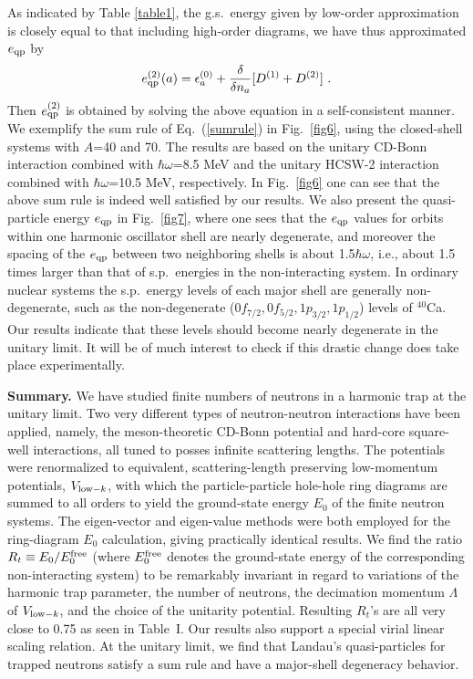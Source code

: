 \documentclass[twocolumn,preprintnumbers,superscriptaddress]{revtex4}
\begin{document}
As indicated by Table \ref{table1}, the g.s.~energy given by low-order approximation is closely equal to that including high-order diagrams,
we have thus approximated $e_{\rm qp}$ by
\begin{equation}
 e_{\rm qp}^{(2)}(a)
 = \epsilon _a^{(0)} +\frac{\delta}{\delta n_a}[D^{(1)}+D^{(2)}]~.
\end{equation}
Then $e_{\rm qp}^{(2)}$ is obtained by solving the above equation in a self-consistent manner.
We exemplify the sum rule of Eq.~(\ref{sumrule}) in Fig.~\ref{fig6}, using the closed-shell systems with $A$=40 and 70.
The results are based on the unitary CD-Bonn interaction
combined with $\hbar\omega$=8.5 MeV
and the unitary HCSW-2 interaction combined with
$\hbar\omega$=10.5 MeV, respectively.
In Fig.~\ref{fig6} one can see that the above sum rule is indeed well satisfied by our results.
We also present the quasi-particle energy $e_{\rm qp}$
in Fig.~\ref{fig7}, where one sees that
the $e_{\rm qp}$ values for orbits within one harmonic oscillator
shell are nearly degenerate,
and moreover the spacing of the $e_{\rm qp}$ between two
neighboring shells is about 1.5$\hbar\omega$,
i.e., about 1.5 times larger than that of
s.p.~energies in the non-interacting system.
In ordinary nuclear systems the s.p.~energy levels
of each major shell are generally non-degenerate, such as the non-degenerate
($0f_{7/2},0f_{5/2},1p_{3/2},1p_{1/2}$) levels of $^{40}$Ca.
Our results indicate that these levels should become
nearly degenerate in the unitary limit. It will be
of much interest to check if this drastic change does take place experimentally.


\vskip 0.4cm
{\bf Summary.}
We have studied finite numbers of neutrons in a harmonic
trap at the unitary limit.
Two very different types of neutron-neutron interactions have
been applied, namely, the
meson-theoretic CD-Bonn potential and hard-core square-well interactions, all
tuned to posses infinite scattering lengths. The potentials were renormalized
to equivalent, scattering-length preserving
low-momentum potentials, $V_{{\rm low}-k}$,
with which the particle-particle hole-hole
ring diagrams are summed to all orders
to yield the ground-state energy $E_0$ of the finite neutron systems.
The eigen-vector and eigen-value methods were both employed
for the ring-diagram $E_0$ calculation,
giving practically identical results.
We find the ratio
$R_t \equiv E_0/E_0^{\rm free}$ (where $E_0^{\rm free}$ denotes
the ground-state energy of the corresponding non-interacting system)
to be remarkably invariant in regard to variations of the harmonic
trap parameter,
the number of neutrons,
the decimation momentum $\Lambda$ of $V_{{\rm low}-k}$,
and the choice of the unitarity potential.
Resulting $R_t$'s
are all very close to 0.75 as seen in Table~I.
Our results also support a special virial linear scaling relation.
At the unitary limit, we find that Landau's
quasi-particles for trapped neutrons satisfy a sum rule
and have a major-shell degeneracy behavior.
\end{document}
